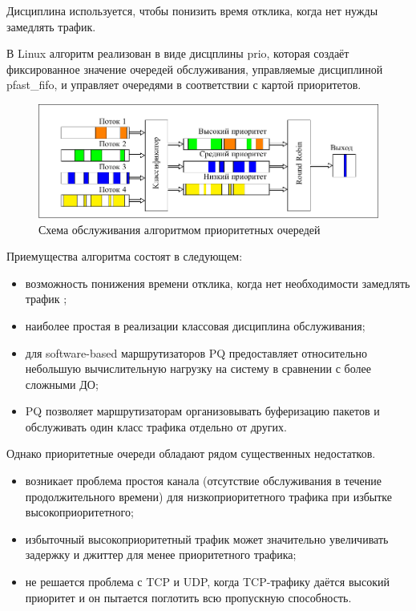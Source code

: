     Дисциплина используется, чтобы понизить время отклика, когда нет нужды замедлять трафик\cite{tcprio}. 

    В Linux алгоритм реализован в виде дисцплины prio, которая создаёт фиксированное
    значение очередей обслуживания, управляемые дисциплиной pfast\_fifo, и управляет
    очередями в соответствии с картой приоритетов.\cite{tcprio}

    \begin{figure}[ht!]
        \center
        \includegraphics{pdfimages/pq.pdf}
        \caption{Схема обслуживания алгоритмом приоритетных очередей}
    \end{figure}

    Приемущества алгоритма состоят в следующем:
    \begin{itemize}
		\item возможность понижения времени отклика, когда нет необходимости замедлять трафик \cite{tcprio};
        \item наиболее простая в реализации классовая дисциплина обслуживания;
        \item для software-based маршрутизаторов PQ предоставляет относительно небольшую
             вычислительную нагрузку на систему в сравнении с более сложными ДО;
        \item PQ позволяет маршрутизаторам организовывать буферизацию пакетов и обслуживать
             один класс трафика отдельно от других. \cite{suppdiff}
    \end{itemize}

    Однако приоритетные очереди обладают рядом существенных недостатков.
    \begin{itemize}
        \item возникает проблема простоя канала (отсутствие обслуживания в течение продолжительного времени)
			  для низкоприоритетного трафика при избытке высокоприоритетного\cite{packethandling};
        \item избыточный высокоприоритетный трафик может значительно увеличивать
                задержку и джиттер для менее приоритетного трафика;
        \item не решается проблема с TCP и UDP, когда TCP-трафику даётся высокий приоритет и он
                пытается поглотить всю пропускную способность. \cite{suppdiff}
    \end{itemize}

